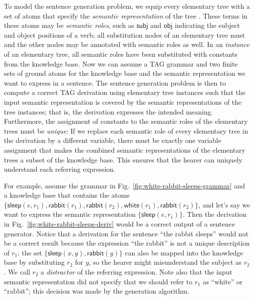 To model the sentence generation problem, we equip every elementary
tree with a set of atoms that specify the \emph{semantic
  representation} of the tree \cite{Stone2003a}.  These terms in these
atoms may be \emph{semantic roles}, such as $\mathsf{subj}$ and
$\mathsf{obj}$ indicating the subject and object positions of a verb;
all substitution nodes of an elementary tree must and the other nodes
may be annotated with semantic roles as well.  In an \emph{instance}
of an elementary tree, all semantic roles have been substituted with
constants from the knowledge base.  Now we can assume a TAG grammar
and two finite sets of ground atoms for the knowledge base and the
semantic representation we want to express in a sentence.  The
sentence generation problem is then to compute a correct TAG
derivation using elementary tree instances such that the input
semantic representation is covered by the semantic representations of
the tree instances; that is, the derivation expresses the intended
meaning.  Furthermore, the assignment of constants to the semantic
roles of the elementary trees must be \emph{unique}: If we replace
each semantic role of every elementary tree in the derivation by a
different variable, there must be exactly one variable assignment that
makes the combined semantic representations of the elementary trees a
subset of the knowledge base.  This ensures that the hearer can
uniquely understand each referring expression.

For example, assume the grammar in
Fig.~\ref{fig:white-rabbit-sleeps-grammar} and a knowledge base that
contains the atoms $\{\mathsf{sleep}(e,r_1), \mathsf{rabbit}(r_1),
\mathsf{rabbit}(r_2), \mathsf{white}(r_1), \mathsf{rabbit}(r_2)\}$,
and let's say we want to express the semantic representation
$\{\mathsf{sleep}(e,r_1)\}$.  Then the derivation in
Fig.~\ref{fig:white-rabbit-sleeps-deriv} would be a correct output of
a sentence generator.  Notice that a derivation for the sentence ``the
rabbit sleeps'' would not be a correct result because the expression
``the rabbit'' is not a unique description of $r_1$: the set
$\{\mathsf{sleep}(x,y), \mathsf{rabbit}(y)\}$ can also be mapped into
the knowledge base by substituting $r_2$ for $y$, so the hearer might
misunderstand the subject as $r_2$. We call $r_2$ a \emph{distractor}
of the referring expression.  Note also that the input semantic
representation did not specify that we should refer to $r_1$ as
``white'' or ``rabbit''; this decision was made by the generation
algorithm.




